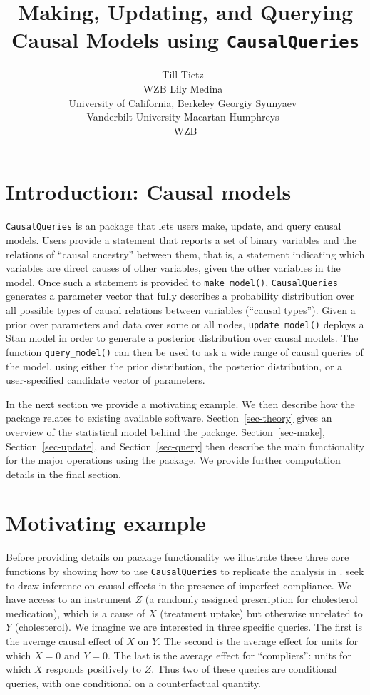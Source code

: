 \documentclass[
  11pt,
  article]{jss}
\author{Till Tietz~\orcidlink{0000-0002-2916-9059}\\WZB \And Lily
Medina~\orcidlink{0009-0004-2423-524X}\\University of California,
Berkeley \AND Georgiy
Syunyaev~\orcidlink{0000-0002-4391-6313}\\Vanderbilt
University \And Macartan Humphreys~\orcidlink{0000-0001-7029-2326}\\WZB}
\title{Making, Updating, and Querying Causal Models using
\texttt{CausalQueries}}
\begin{document}
\maketitle
\hypertarget{sec-intro}{%
\section{Introduction: Causal models}\label{sec-intro}}

\texttt{CausalQueries} is an  package that lets users make,
update, and query causal models. Users provide a statement that reports
a set of binary variables and the relations of ``causal ancestry''
between them, that is, a statement indicating which variables are direct
causes of other variables, given the other variables in the model. Once
such a statement is provided to \texttt{make\_model()},
\texttt{CausalQueries} generates a parameter vector that fully describes
a probability distribution over all possible types of causal relations
between variables (``causal types''). Given a prior over parameters and
data over some or all nodes, \texttt{update\_model()} deploys a Stan
\citep{carpenter_stan_2017} model in order to generate a posterior
distribution over causal models. The function \texttt{query\_model()}
can then be used to ask a wide range of causal queries of the model,
using either the prior distribution, the posterior distribution, or a
user-specified candidate vector of parameters.

In the next section we provide a motivating example. We then describe
how the package relates to existing available software.
Section~\ref{sec-theory} gives an overview of the statistical model
behind the package. Section~\ref{sec-make}, Section~\ref{sec-update},
and Section~\ref{sec-query} then describe the main functionality for the
major operations using the package. We provide further computation
details in the final section.

\hypertarget{motivating-example}{%
\section{Motivating example}\label{motivating-example}}

Before providing details on package functionality we illustrate these
three core functions by showing how to use \texttt{CausalQueries} to
replicate the analysis in
\citetext{\citealp{chickering_clinicians_1996}; \citealp[see
also][]{humphreys_integrated_2023}}. \citet{chickering_clinicians_1996}
seek to draw inference on causal effects in the presence of imperfect
compliance. We have access to an instrument \(Z\) (a randomly assigned
prescription for cholesterol medication), which is a cause of \(X\)
(treatment uptake) but otherwise unrelated to \(Y\) (cholesterol). We
imagine we are interested in three specific queries. The first is the
average causal effect of \(X\) on \(Y\). The second is the average
effect for units for which \(X=0\) and \(Y=0\). The last is the average
effect for ``compliers'': units for which \(X\) responds positively to
\(Z\). Thus two of these queries are conditional queries, with one
conditional on a counterfactual quantity.
\end{document}
